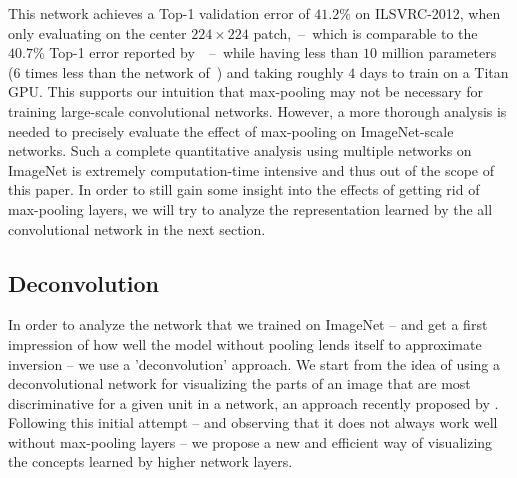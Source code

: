 \documentclass{article} %
\begin{document}
This network achieves a Top-1 validation error of $41.2 \%$ on ILSVRC-2012, when only evaluating on the center $224\times224$ patch,~--~which is comparable to the $40.7 \%$ Top-1 error reported by~\citet{Krizhevsky_NIPS2012}~--~while having less than $10$ million parameters (6 times less than the network of~\citet{Krizhevsky_NIPS2012}) and taking roughly $4$ days to train on a Titan GPU. This supports our intuition that max-pooling may not be necessary for training large-scale convolutional networks. However, a more thorough analysis is needed to precisely evaluate the effect of max-pooling on ImageNet-scale networks. Such a complete quantitative analysis using multiple networks on ImageNet is extremely computation-time intensive and thus out of the scope of this paper. In order to still gain some insight into the effects of getting rid of max-pooling layers, we will try to analyze the representation learned by the all convolutional network in the next section.

\subsection{Deconvolution}
In order to analyze the network that we trained on ImageNet -- and get a first impression of how well the model without pooling lends itself to approximate inversion -- we use a 'deconvolution' approach. We start from the idea of using a deconvolutional network for visualizing the parts of an image that are most discriminative for a given unit in a network, an approach recently proposed by \citet{Zeiler_ECCV2014}. Following this initial attempt -- and observing that it does not always work well without max-pooling layers -- we propose a new and efficient way of visualizing the concepts learned by higher network layers. 
\end{document}
